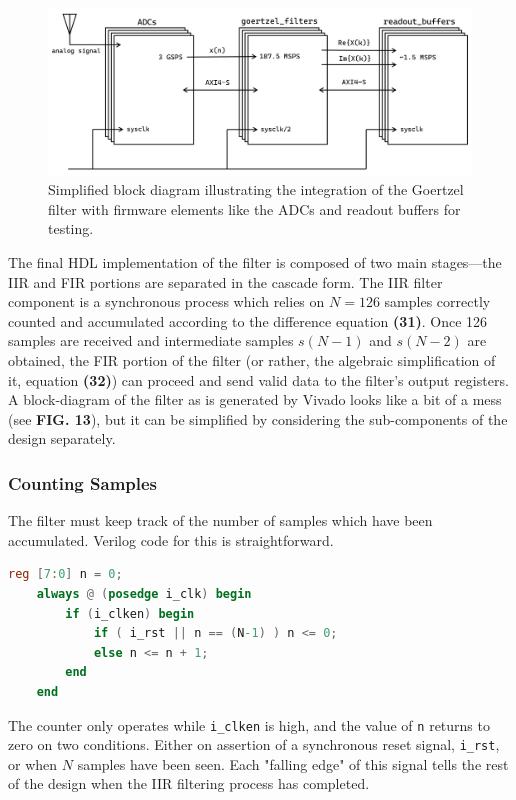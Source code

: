 \documentclass[reprint,amsmath,amssymb]{revtex4-2}
\begin{document}
\begin{figure}
    \centering
    \includegraphics[width=\linewidth]{figs/bd_goertzel_simple.png}
    \caption{Simplified block diagram illustrating the integration of the Goertzel filter with firmware elements like the ADCs and readout buffers for testing.}
    \label{fig:14}
\end{figure}

The final HDL implementation of the filter is composed of two main stages---the IIR and FIR portions are separated in the cascade form. The IIR filter component is a synchronous process which relies on $N = 126$ samples correctly counted and accumulated according to the difference equation \textbf{(31)}. Once 126 samples are received and intermediate samples $s(N-1)$ and $s(N-2)$ are obtained, the FIR portion of the filter (or rather, the algebraic simplification of it, equation \textbf{(32)}) can proceed and send valid data to the filter's output registers. A block-diagram of the filter as is generated by Vivado looks like a bit of a mess (see \textbf{FIG. 13}), but it can be simplified by considering the sub-components of the design separately.

\subsubsection{Counting Samples}
The filter must keep track of the number of samples which have been accumulated. Verilog code for this is straightforward.

\begin{lstlisting}[language=Verilog]
    reg [7:0] n = 0;
    always @ (posedge i_clk) begin
        if (i_clken) begin
            if ( i_rst || n == (N-1) ) n <= 0;
            else n <= n + 1;
        end
    end
\end{lstlisting}

The counter only operates while \verb|i_clken| is high, and the value of \verb|n| returns to zero on two conditions. Either on assertion of a synchronous reset signal, \verb|i_rst|, or when $N$ samples have been seen. Each "falling edge" of this signal tells the rest of the design when the IIR filtering process has completed.
\end{document}
